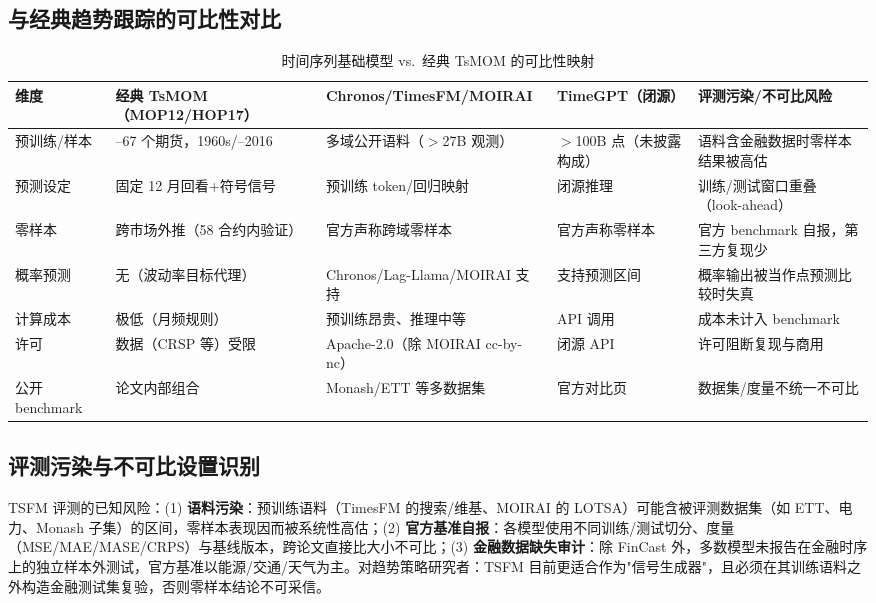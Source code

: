 \documentclass[11pt,a4paper]{article}
\begin{document}
\subsection{与经典趋势跟踪的可比性对比}
\begin{table}[htbp]
\centering\scriptsize
\caption{时间序列基础模型 vs.\ 经典 TsMOM 的可比性映射}\label{tab:fm}
\begin{tabular}{@{}>{\raggedright\arraybackslash}p{2.2cm}>{\raggedright\arraybackslash}p{3.2cm}>{\raggedright\arraybackslash}p{3.2cm}>{\raggedright\arraybackslash}p{3.2cm}>{\raggedright\arraybackslash}p{3.0cm}@{}}
\toprule
\textbf{维度} & \textbf{经典 TsMOM（MOP12/HOP17）} & \textbf{Chronos/TimesFM/\allowbreak MOIRAI} & \textbf{TimeGPT（闭源）} & \textbf{评测污染/\allowbreak 不可比风险} \\
\midrule
预训练/样本 & 58--67 个期货，1960s/\allowbreak 1880--2016 & 多域公开语料（$>$27B 观测） & $>$100B 点（未披露构成） & 语料含金融数据时零样本结果被高估 \\
预测设定 & 固定 12 月回看+符号信号 & 预训练 token/回归映射 & 闭源推理 & 训练/测试窗口重叠（look-ahead） \\
零样本 & 跨市场外推（58 合约内验证） & 官方声称跨域零样本 & 官方声称零样本 & 官方 benchmark 自报，第三方复现少 \\
概率预测 & 无（波动率目标代理） & Chronos/Lag-Llama/MOIRAI 支持 & 支持预测区间 & 概率输出被当作点预测比较时失真 \\
计算成本 & 极低（月频规则） & 预训练昂贵、推理中等 & API 调用 & 成本未计入 benchmark \\
许可 & 数据（CRSP 等）受限 & Apache-2.0（除 MOIRAI cc-by-nc） & 闭源 API & 许可阻断复现与商用 \\
公开 benchmark & 论文内部组合 & Monash/ETT 等多数据集 & 官方对比页 & 数据集/度量不统一不可比 \\
\bottomrule
\end{tabular}
\end{table}

\subsection{评测污染与不可比设置识别}
TSFM 评测的已知风险：(1) \textbf{语料污染}：预训练语料（TimesFM 的搜索/维基、MOIRAI 的 LOTSA）可能含被评测数据集（如 ETT、电力、Monash 子集）的区间，零样本表现因而被系统性高估；(2) \textbf{官方基准自报}：各模型使用不同训练/测试切分、度量（MSE/MAE/MASE/CRPS）与基线版本，跨论文直接比大小不可比；(3) \textbf{金融数据缺失审计}：除 FinCast 外，多数模型未报告在金融时序上的独立样本外测试，官方基准以能源/交通/天气为主。对趋势策略研究者：TSFM 目前更适合作为"信号生成器"，且必须在其训练语料之外构造金融测试集复验，否则零样本结论不可采信。
\end{document}
